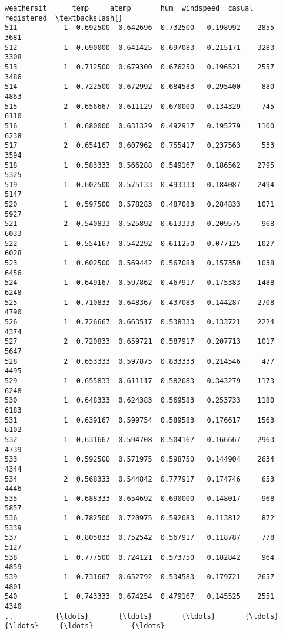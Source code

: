 \documentclass[11pt]{article}
\begin{document}
\begin{Verbatim}[commandchars=\\\{\}]
     weathersit      temp     atemp       hum  windspeed  casual  registered  \textbackslash{}
511           1  0.692500  0.642696  0.732500   0.198992    2855        3681   
512           1  0.690000  0.641425  0.697083   0.215171    3283        3308   
513           1  0.712500  0.679300  0.676250   0.196521    2557        3486   
514           1  0.722500  0.672992  0.684583   0.295400     880        4863   
515           2  0.656667  0.611129  0.670000   0.134329     745        6110   
516           1  0.680000  0.631329  0.492917   0.195279    1100        6238   
517           2  0.654167  0.607962  0.755417   0.237563     533        3594   
518           1  0.583333  0.566288  0.549167   0.186562    2795        5325   
519           1  0.602500  0.575133  0.493333   0.184087    2494        5147   
520           1  0.597500  0.578283  0.487083   0.284833    1071        5927   
521           2  0.540833  0.525892  0.613333   0.209575     968        6033   
522           1  0.554167  0.542292  0.611250   0.077125    1027        6028   
523           1  0.602500  0.569442  0.567083   0.157350    1038        6456   
524           1  0.649167  0.597862  0.467917   0.175383    1488        6248   
525           1  0.710833  0.648367  0.437083   0.144287    2708        4790   
526           1  0.726667  0.663517  0.538333   0.133721    2224        4374   
527           2  0.720833  0.659721  0.587917   0.207713    1017        5647   
528           2  0.653333  0.597875  0.833333   0.214546     477        4495   
529           1  0.655833  0.611117  0.582083   0.343279    1173        6248   
530           1  0.648333  0.624383  0.569583   0.253733    1180        6183   
531           1  0.639167  0.599754  0.589583   0.176617    1563        6102   
532           1  0.631667  0.594708  0.504167   0.166667    2963        4739   
533           1  0.592500  0.571975  0.598750   0.144904    2634        4344   
534           2  0.568333  0.544842  0.777917   0.174746     653        4446   
535           1  0.688333  0.654692  0.690000   0.148017     968        5857   
536           1  0.782500  0.720975  0.592083   0.113812     872        5339   
537           1  0.805833  0.752542  0.567917   0.118787     778        5127   
538           1  0.777500  0.724121  0.573750   0.182842     964        4859   
539           1  0.731667  0.652792  0.534583   0.179721    2657        4801   
540           1  0.743333  0.674254  0.479167   0.145525    2551        4340   
..          {\ldots}       {\ldots}       {\ldots}       {\ldots}        {\ldots}     {\ldots}         {\ldots}   

\end{Verbatim}
\end{document}
